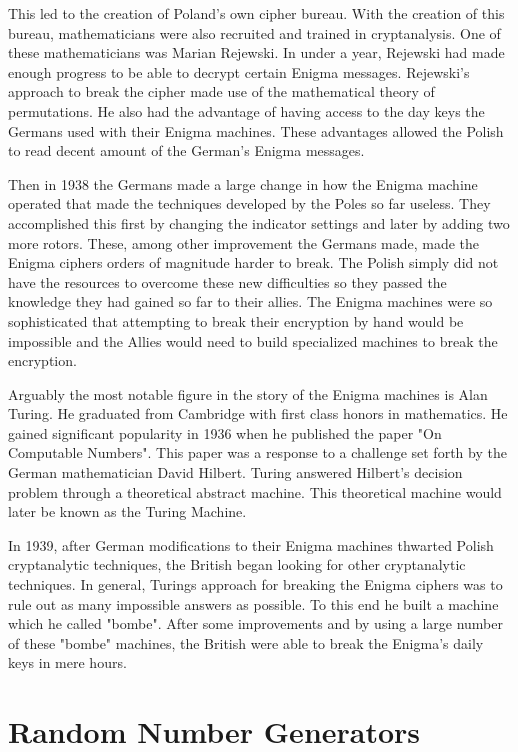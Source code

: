 \documentclass{article}
\begin{document}
    This led to the creation of Poland's own cipher bureau.
    With the creation of this bureau, mathematicians were also recruited
    and trained in cryptanalysis.
    One of these mathematicians was Marian Rejewski.
    In under a year, Rejewski had made enough progress to be able to decrypt
    certain Enigma messages.
    Rejewski's approach to break the cipher made use of the mathematical theory
    of permutations.
    He also had the advantage of having access to the day keys the Germans used
    with their Enigma machines.
    These advantages allowed the Polish to read decent amount of the German's
    Enigma messages.

    Then in 1938 the Germans made a large change in how the Enigma machine operated
    that made the techniques developed by the Poles so far useless.
    They accomplished this first by changing the indicator settings and later
    by adding two more rotors. These, among other improvement the Germans made,
    made the Enigma ciphers orders of magnitude harder to break.
    The Polish simply did not have the resources to overcome these new
    difficulties so they passed the knowledge they had gained so far to
    their allies.
    The Enigma machines were so sophisticated that attempting to break their
    encryption by hand would be impossible and the Allies would need to build specialized
    machines to break the encryption.

    Arguably the most notable figure in the story of the Enigma machines
    is Alan Turing. He graduated from Cambridge with first class honors in
    mathematics.
    He gained significant popularity in 1936 when he published the paper
    "On Computable Numbers". This paper was a response to a challenge
    set forth by the German mathematician David Hilbert.
    Turing answered Hilbert's decision problem through a theoretical abstract
    machine. This theoretical machine would later be known as the Turing Machine.

    In 1939, after German modifications to their Enigma machines thwarted
    Polish cryptanalytic techniques, the British began looking
    for other cryptanalytic techniques.
    In general, Turings approach for breaking the Enigma ciphers was
    to rule out as many impossible answers as possible.
    To this end he built a machine which he called "bombe".
    After some improvements and by using a large number of these "bombe" machines,
    the British were able to break the Enigma's daily keys in mere hours.

    \section{Random Number Generators}
\end{document}
